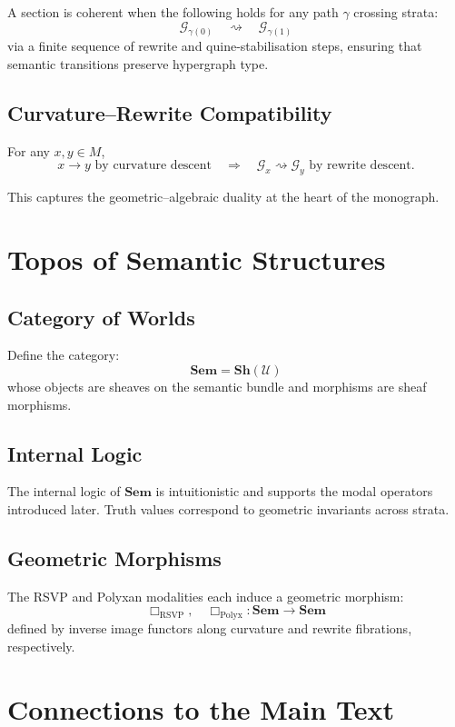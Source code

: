 A section is coherent when the following holds for any path $\gamma$ crossing strata:
\[
\mathcal{G}_{\gamma(0)} \quad\rightsquigarrow\quad \mathcal{G}_{\gamma(1)}
\]
via a finite sequence of rewrite and quine-stabilisation steps, ensuring that semantic transitions preserve hypergraph type.

\subsection{Curvature–Rewrite Compatibility}

For any $x,y \in M$,
\[
x \to y \text{ by curvature descent}
\quad\Longrightarrow\quad
\mathcal{G}_x \rightsquigarrow \mathcal{G}_y \text{ by rewrite descent}.
\]

This captures the geometric–algebraic duality at the heart of the monograph.

\section{Topos of Semantic Structures}

\subsection{Category of Worlds}

Define the category:
\[
\mathbf{Sem} = \mathbf{Sh}(\mathcal{U})
\]
whose objects are sheaves on the semantic bundle and morphisms are sheaf morphisms.

\subsection{Internal Logic}

The internal logic of $\mathbf{Sem}$ is intuitionistic and supports the modal operators introduced later. Truth values correspond to geometric invariants across strata.

\subsection{Geometric Morphisms}

The RSVP and Polyxan modalities each induce a geometric morphism:
\[
\Box_{\mathrm{RSVP}},\quad \Box_{\mathrm{Polyx}} : \mathbf{Sem} \to \mathbf{Sem}
\]
defined by inverse image functors along curvature and rewrite fibrations, respectively.

\section{Connections to the Main Text}

